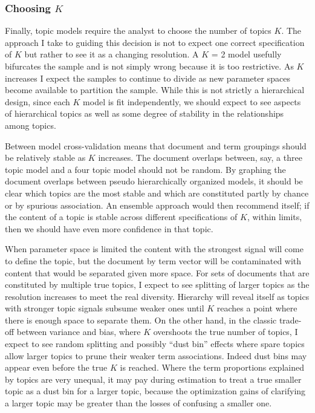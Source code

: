\documentclass[]{book}
\theoremstyle{definition}
\theoremstyle{definition}
\theoremstyle{definition}
\theoremstyle{remark}
\begin{document}
\hypertarget{choosing-k}{%
\subsubsection{\texorpdfstring{Choosing
\(K\)}{Choosing K}}\label{choosing-k}}

Finally, topic models require the analyst to choose the number of topics
\(K\). The approach I take to guiding this decision is not to expect one
correct specification of \(K\) but rather to see it as a changing
resolution. A \(K\) = 2 model usefully bifurcates the sample and is not
simply wrong because it is too restrictive. As \(K\) increases I expect
the samples to continue to divide as new parameter spaces become
available to partition the sample. While this is not strictly a
hierarchical design, since each \(K\) model is fit independently, we
should expect to see aspects of hierarchical topics as well as some
degree of stability in the relationships among topics.

Between model cross-validation means that document and term groupings
should be relatively stable as \(K\) increases. The document overlaps
between, say, a three topic model and a four topic model should not be
random. By graphing the document overlaps between pseudo hierarchically
organized models, it should be clear which topics are the most stable
and which are constituted partly by chance or by spurious association.
An ensemble approach would then recommend itself; if the content of a
topic is stable across different specifications of \(K\), within limits,
then we should have even more confidence in that topic.

When parameter space is limited the content with the strongest signal
will come to define the topic, but the document by term vector will be
contaminated with content that would be separated given more space. For
sets of documents that are constituted by multiple true topics, I expect
to see splitting of larger topics as the resolution increases to meet
the real diversity. Hierarchy will reveal itself as topics with stronger
topic signals subsume weaker ones until \(K\) reaches a point where
there is enough space to separate them. On the other hand, in the
classic trade-off between variance and bias, where \(K\) overshoots the
true number of topics, I expect to see random splitting and possibly
``dust bin'' effects where spare topics allow larger topics to prune
their weaker term associations. Indeed dust bins may appear even before
the true \(K\) is reached. Where the term proportions explained by
topics are very unequal, it may pay during estimation to treat a true
smaller topic as a dust bin for a larger topic, because the optimization
gains of clarifying a larger topic may be greater than the losses of
confusing a smaller one.
\end{document}
